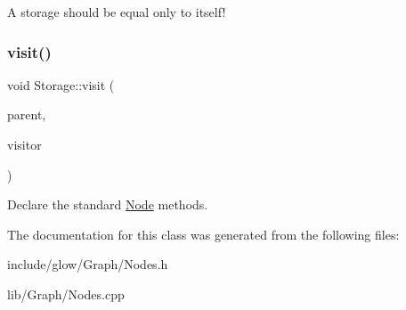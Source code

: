 A storage should be equal only to itself! \mbox{\label{classglow_1_1_storage_a1fe8d4de0e28ca6953f12b6c00c6f5bf}} 
\subsubsection{\texorpdfstring{visit()}{visit()}}
{\footnotesize\ttfamily void Storage\+::visit (\begin{DoxyParamCaption}\item[{\hyperlink{classglow_1_1_node}{Node} $\ast$}]{parent,  }\item[{\hyperlink{classglow_1_1_node_walker}{Node\+Walker} $\ast$}]{visitor }\end{DoxyParamCaption})}

Declare the standard \hyperlink{classglow_1_1_node}{Node} methods. 

The documentation for this class was generated from the following files\+:\begin{DoxyCompactItemize}
\item 
include/glow/\+Graph/Nodes.\+h\item 
lib/\+Graph/Nodes.\+cpp\end{DoxyCompactItemize}
